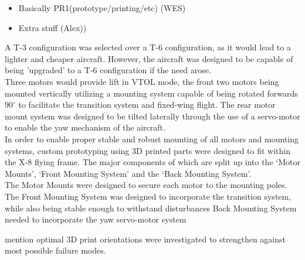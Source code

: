 \color{red}
\begin{itemize}
\item Basically PR1(prototype/printing/etc) (WES)
\item Extra stuff (Alex))
\end{itemize}
\color{black}

A T-3 configuration was selected over a T-6 configuration, as it would lead to a lighter and cheaper aircraft. However, the aircraft was designed to be capable of being 'upgraded' to a T-6 configuration if the need arose.\\
Three motors would provide lift in VTOL mode, the front two motors being mounted vertically utilizing a mounting system capable of being rotated forwards $90^{\circ}$ to facilitate the transition system and fixed-wing flight. The rear motor mount system was designed to be tilted laterally through the use of a servo-motor to enable the yaw mechanism of the aircraft.\\
In order to enable proper stable and robust mounting of all motors and mounting systems, custom prototyping using 3D printed parts were designed to fit within the X-8 flying frame. The major components of which are split up into the `Motor Mounts', `Front  Mounting System' and the `Back Mounting System'.\\
The Motor Mounts were designed to secure each motor to the mounting poles. 
The Front Mounting System was designed to incorporate the transition system, while also being stable enough to withstand disturbances
Back Mounting System needed to incorporate the yaw servo-motor system

mention optimal 3D print orientations were investigated to strengthen against most possible failure modes.
